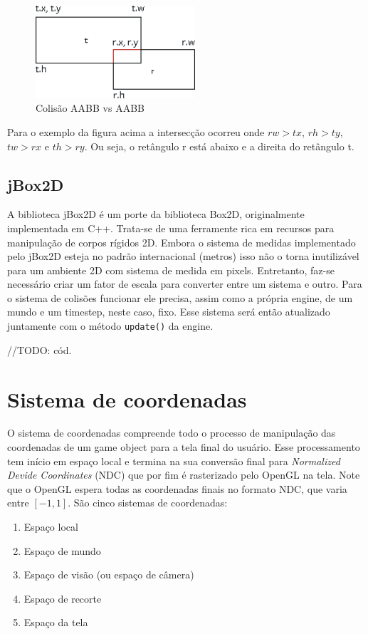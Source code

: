 \documentclass[12pt, 
openright, 
oneside, 
a4paper,    
brazil]{facom-ufu-abntex2}
\begin{document}
\begin{figure}[H]
	\centering
	\includegraphics[width=16em]{imagens/aabbaabb.png}
	\caption{Colisão AABB vs AABB}
\end{figure}

Para o exemplo da figura acima a intersecção ocorreu onde $rw > tx$, $rh > ty$, $tw > rx$ e $th > ry$. Ou seja, o retângulo r está abaixo e a direita do retângulo t.

\subsection{jBox2D}

A biblioteca jBox2D é um porte da biblioteca Box2D, originalmente implementada em C++. Trata-se de uma ferramente rica em recursos para manipulação de corpos rígidos 2D. Embora o sistema de medidas implementado pelo jBox2D esteja no padrão internacional (metros) isso não o torna inutilizável para um ambiente 2D com sistema de medida em pixels. Entretanto, faz-se necessário criar um fator de escala para converter entre um sistema e outro. Para o sistema de colisões funcionar ele precisa, assim como a própria engine, de um mundo e um timestep, neste caso, fixo. Esse sistema será então atualizado juntamente com o método \texttt{update()} da engine.

//TODO: cód.

\section{Sistema de coordenadas}

O sistema de coordenadas compreende todo o processo de manipulação das coordenadas de um game object para a tela final do usuário. Esse processamento tem início em espaço local e termina na sua conversão final para \textit{Normalized Devide Coordinates} (NDC) que por fim é rasterizado pelo OpenGL na tela. Note que o OpenGL espera todas as coordenadas finais no formato NDC, que varia entre $[-1,1]$. São cinco sistemas de coordenadas:

\begin{enumerate}
    \item Espaço local
    \item Espaço de mundo
    \item Espaço de visão (ou espaço de câmera)
    \item Espaço de recorte
    \item Espaço da tela
\end{enumerate}
\end{document}
